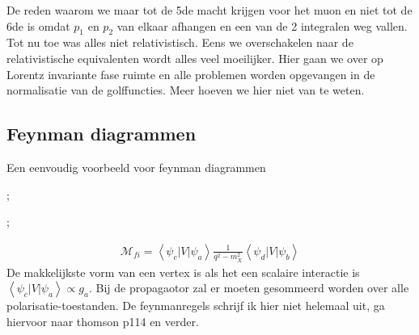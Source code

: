 \documentclass[../main.tex]{subfiles}
\begin{document}
De reden waarom we maar tot de 5de macht krijgen voor het muon en niet tot de 6de is omdat $p_1$ en $p_2$ van elkaar afhangen en een van de 2 integralen weg vallen.\\
Tot nu toe was alles niet relativistisch. Eens we overschakelen naar de relativistische equivalenten wordt alles veel moeilijker. Hier gaan we over op Lorentz invariante fase ruimte en alle problemen worden opgevangen in de normalisatie van de golffuncties. Meer hoeven we hier niet van te weten.

\subsection{Feynman diagrammen}%
\label{sub:feynman_diagrammen}

Een eenvoudig voorbeeld voor feynman diagrammen\\
\begin{minipage}[c]{0.5\textwidth}
    \begin{center}
        ;
    \end{center}
\end{minipage}\noindent
\begin{minipage}[c]{0.5\textwidth}
    \begin{center}
        ;
    \end{center}
\end{minipage}
\begin{equation}
    \begin{aligned}
        \label{eq:fd_voorbeeld}
        \mathcal{M}_{fi}=\left<\psi_c|V|\psi_a\right> \frac{1}{q^2-m_X^2} \left<\psi_d|V|\psi_b\right>
    \end{aligned}
\end{equation}
De makkelijkste vorm van een vertex is als het een scalaire interactie is $\left<\psi_c|V|\psi_a\right> \propto g_a$. Bij de propagaotor zal er moeten gesommeerd worden over alle polarisatie-toestanden. De feynmanregels schrijf ik hier niet helemaal uit, ga hiervoor naar thomson p114 en verder.
\end{document}
